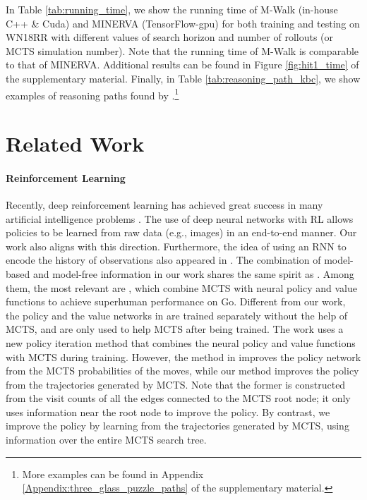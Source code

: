 \documentclass{article}
\begin{document}
	
In Table \ref{tab:running_time}, we show the running time of M-Walk (in-house C++ \& Cuda) and MINERVA (TensorFlow-gpu) for both training and testing on WN18RR with different values of search horizon and number of rollouts (or MCTS simulation number). Note that the running time of M-Walk is comparable to that of MINERVA. Additional results can be found in Figure \ref{fig:hit1_time} of the supplementary material. Finally, in Table \ref{tab:reasoning_path_kbc}, we show examples of reasoning paths found by \modelname.\footnote{More examples can be found in Appendix \ref{Appendix:three_glass_puzzle_paths} of the supplementary material.}





	
	
	
	
	
	
	
	\section{Related Work}
	\label{Sec:RelatedWork}
	
	\paragraph{Reinforcement Learning}
	Recently, deep reinforcement learning has achieved great success in many artificial intelligence problems \cite{mnih2015human,silver2016mastering, silver2017mastering}. The use of deep neural networks with RL allows policies to be learned from raw data (e.g., images) in an end-to-end manner. Our work also aligns with this direction. Furthermore, the idea of using an RNN to encode the history of observations also appeared in \cite{HausknechtS15, wierstra2010recurrent}. The combination of  model-based and model-free information in our work shares the same spirit as \cite{silver2016mastering, silver2017mastering, pmlr-v70-silver17a, Imagination-Augmented}. Among them, the most relevant are \cite{silver2016mastering, silver2017mastering}, which combine MCTS with neural policy and value functions to achieve superhuman performance on Go. Different from our work, the policy and the value networks in \cite{silver2016mastering} are trained separately without the help of MCTS, and are only used to help MCTS after being trained. The work \cite{silver2017mastering} uses a new policy iteration method that combines the neural policy and value functions with MCTS during training. However, the method in \cite{silver2017mastering} improves the policy network from the MCTS probabilities of the moves, while our method improves the policy from the trajectories generated by MCTS. Note that the former is constructed from the visit counts of all the edges connected to the MCTS root node; it only uses information near the root node to improve the policy. By contrast, we improve the policy by learning from the trajectories generated by MCTS, using information over the entire MCTS search tree.
	
\end{document}
